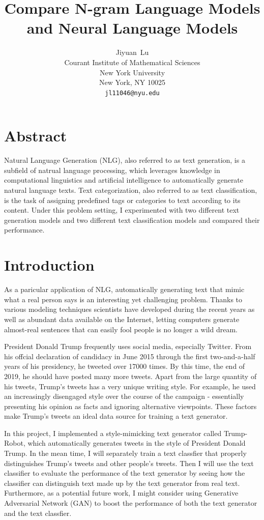 \documentclass{article}
\title{Compare N-gram Language Models and Neural Language Models}
\author{%
  Jiyuan~Lu\\
  Courant Institute of Mathematical Sciences\\
  New York University\\
  New York, NY 10025 \\
  \texttt{jl11046@nyu.edu} \\
}
\begin{document}
\maketitle

\section{Abstract}
Natural Language Generation (NLG), also referred to as text generation, is a subfield of natrual language processing, which leverages knowledge in computational linguistics and artificial intelligence to automatically generate natural language texts. Text categorization, also referred to as text classification, is the task of assigning predefined tags or categories to text according to its content. Under this problem setting, I experimented with two different text generation models and two different text classification models and compared their performance.

\section{Introduction}
As a paricular application of NLG, automatically generating text that mimic what a real person says is an interesting yet challenging problem. Thanks to various modeling techniques scientists have developed during the recent years as well as abundant data available on the Internet, letting computers generate almost-real sentences that can easily fool people is no longer a wild dream.

President Donald Trump frequently uses social media, especially Twitter. From his offcial declaration of candidacy in June 2015 through the first two-and-a-half years of his presidency, he tweeted over 17000 times. By this time, the end of 2019, he should have posted many more tweets. Apart from the large quantity of his tweets, Trump's tweets has a very unique writing style. For example, he used an increasingly disengaged style over the course of the campaign - essentially presenting his opinion as facts and ignoring alternative viewpoints. These factors make Trump's tweets an ideal data source for training a text generator.

In this project, I implemented a style-mimicking text generator called Trump-Robot, which automatically generates tweets in the style of President Donald Trump. In the mean time, I will separately train a text classfier that properly distinguishes Trump's tweets and other people's tweets. Then I will use the text classifier to evaluate the performance of the text generator by seeing how the classifier can distinguish text made up by the text generator from real text. Furthermore, as a potential future work, I might consider using Generative Adversarial Network (GAN) to boost the performance of both the text generator and the text classfier.
\end{document}
